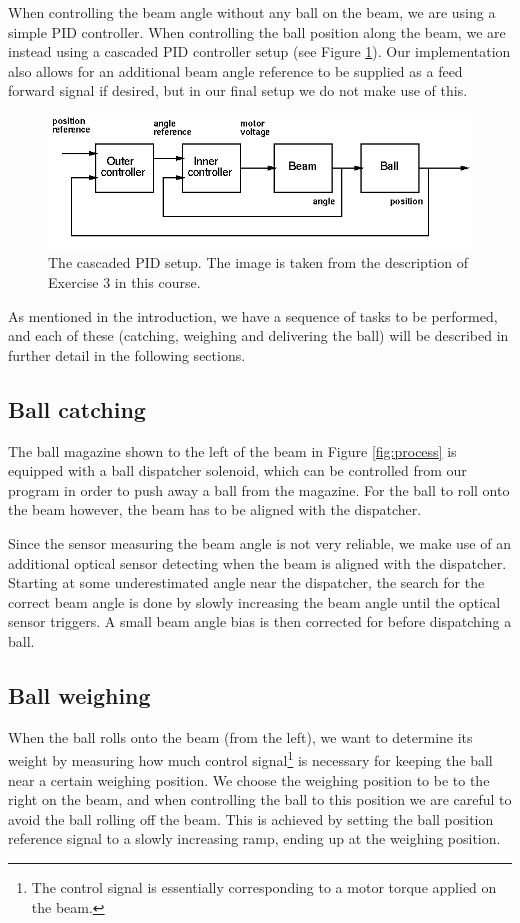 When controlling the beam angle without any ball on the beam, we are using a simple PID controller.
When controlling the ball position along the beam, we are instead using a cascaded PID controller setup (see Figure \ref{fig:cascaded_pid}).
Our implementation also allows for an additional beam angle reference to be supplied as a feed forward signal if desired, but in our final setup we do not make use of this.
\begin{figure}
\centering
\includegraphics[width=\textwidth]{figures/block_diagram.png}
\caption{The cascaded PID setup. The image is taken from the description of Exercise 3 in this course.}\label{fig:cascaded_pid}
\end{figure}

As mentioned in the introduction, we have a sequence of tasks to be performed, and each of these (catching, weighing and delivering the ball) will be described in further detail in the following sections.

\subsection{Ball catching}\label{sec:ball_catching}
The ball magazine shown to the left of the beam in Figure \ref{fig:process} is equipped with a ball dispatcher solenoid, which can be controlled from our program in order to push away a ball from the magazine.
For the ball to roll onto the beam however, the beam has to be aligned with the dispatcher.

Since the sensor measuring the beam angle is not very reliable, we make use of an additional optical sensor detecting when the beam is aligned with the dispatcher.
Starting at some underestimated angle near the dispatcher, the search for the correct beam angle is done by slowly increasing the beam angle until the optical sensor triggers. A small beam angle bias is then corrected for before dispatching a ball.

\subsection{Ball weighing}\label{sec:ball_weighing}
When the ball rolls onto the beam (from the left), we want to determine its weight by measuring how much control signal\footnote{The control signal is essentially corresponding to a motor torque applied on the beam.} is necessary for keeping the ball near a certain weighing position.
We choose the weighing position to be to the right on the beam, and when controlling the ball to this position we are careful to avoid the ball rolling off the beam.
This is achieved by setting the ball position reference signal to a slowly increasing ramp, ending up at the weighing position.

